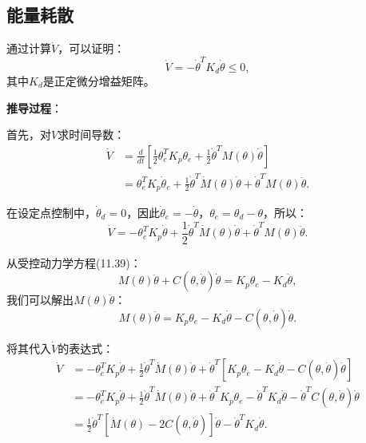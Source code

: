 \documentclass{article}
\begin{document}
\subsection{能量耗散}

通过计算$\dot{V}$，可以证明：
\begin{equation}
\dot{V} = -\dot{\theta}^T K_d\dot{\theta} \leq 0,
\end{equation}
其中$K_d$是正定微分增益矩阵。

\textbf{推导过程}：

首先，对$V$求时间导数：
\begin{align}
\dot{V} &= \frac{d}{dt}\left[\frac{1}{2}\theta_e^T K_p\theta_e + \frac{1}{2}\dot{\theta}^T M(\theta)\dot{\theta}\right] \\
        &= \theta_e^T K_p\dot{\theta}_e + \frac{1}{2}\dot{\theta}^T \dot{M}(\theta)\dot{\theta} + \dot{\theta}^T M(\theta)\ddot{\theta}.
\end{align}

在设定点控制中，$\dot{\theta}_d = 0$，因此$\dot{\theta}_e = -\dot{\theta}$，$\theta_e = \theta_d - \theta$，所以：
\begin{equation}
\dot{V} = -\theta_e^T K_p\dot{\theta} + \frac{1}{2}\dot{\theta}^T \dot{M}(\theta)\dot{\theta} + \dot{\theta}^T M(\theta)\ddot{\theta}.
\end{equation}

从受控动力学方程(11.39)：
\begin{equation}
M(\theta)\ddot{\theta} + C(\theta, \dot{\theta})\dot{\theta} = K_p\theta_e - K_d\dot{\theta},
\end{equation}
我们可以解出$M(\theta)\ddot{\theta}$：
\begin{equation}
M(\theta)\ddot{\theta} = K_p\theta_e - K_d\dot{\theta} - C(\theta, \dot{\theta})\dot{\theta}.
\end{equation}

将其代入$\dot{V}$的表达式：
\begin{align}
\dot{V} &= -\theta_e^T K_p\dot{\theta} + \frac{1}{2}\dot{\theta}^T \dot{M}(\theta)\dot{\theta} + \dot{\theta}^T[K_p\theta_e - K_d\dot{\theta} - C(\theta, \dot{\theta})\dot{\theta}] \\
        &= -\theta_e^T K_p\dot{\theta} + \frac{1}{2}\dot{\theta}^T \dot{M}(\theta)\dot{\theta} + \dot{\theta}^T K_p\theta_e - \dot{\theta}^T K_d\dot{\theta} - \dot{\theta}^T C(\theta, \dot{\theta})\dot{\theta} \\
        &= \frac{1}{2}\dot{\theta}^T[\dot{M}(\theta) - 2C(\theta, \dot{\theta})]\dot{\theta} - \dot{\theta}^T K_d\dot{\theta}.
\end{align}
\end{document}
